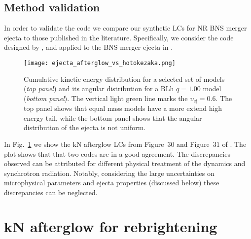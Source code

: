 \subsection{Method validation}

In order to validate the code we compare our synthetic \acp{LC} for \ac{NR} 
\ac{BNS} merger ejecta to those published in the literature. 
Specifically, we consider the code designed by \citet{Hotokezaka:2015eja},
and applied to the \ac{BNS} merger ejecta in \citet{Radice:2018pdn}.

\begin{figure}%
    \centering 
    \texttt{[image: ejecta\_afterglow\_vs\_hotokezaka.png]}
    \caption{
        Cumulative kinetic energy distribution for a selected set of models (\textit{top panel}) 
        and its angular distribution for a BLh $q=1.00$ model (\textit{bottom panel}).
        The vertical light green line marks the $\upsilon_{\text{ej}}=0.6$.
        The top panel shows that equal mass models have a more extend high energy tail,
        while the bottom panel shows that the angular distribution of the ejecta is not 
        uniform.
    } 
    \label{fig:afg_test}
\end{figure}

In Fig.~\ref{fig:afg_test} we show the \ac{kN} afterglow \acp{LC} from 
Figure~$30$ and Figure~$31$ of \citet{Radice:2018pdn}. The plot shows that that 
two codes are in a good agreement. The discrepancies observed can be attributed 
for different physical treatment of the \blast{} dynamics and synchrotron radiation. 
Notably, considering the large uncertainties on microphysical parameters and 
ejecta properties (discussed below) these discrepancies can be neglected.



\section{\ac{kN} afterglow for \GRB{} rebrightening} \label{sec:afterglow:results}





